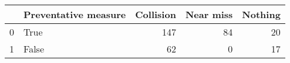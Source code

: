 \begin{tabular}{llrrr}
\toprule
{} &  Preventative measure &  Collision &  Near miss &  Nothing \\
\midrule
0 &                  True &        147 &         84 &       20 \\
1 &                 False &         62 &          0 &       17 \\
\bottomrule
\end{tabular}
